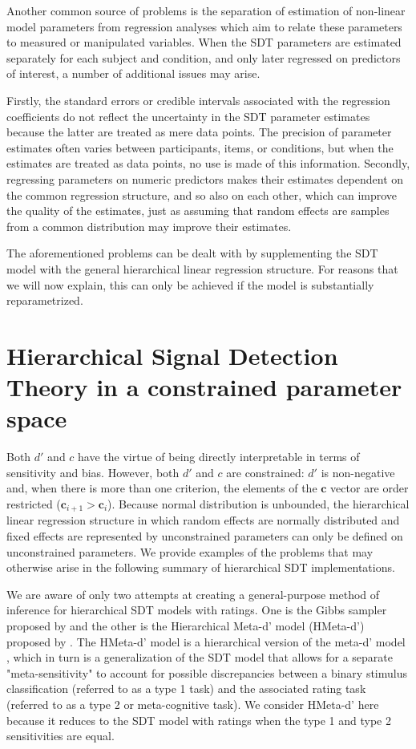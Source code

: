\documentclass[a4paper,man,apacite,floatsintext]{apa6}
\begin{document}
Another common source of problems is the separation of estimation of
non-linear model parameters from regression analyses which aim to
relate these parameters to measured or manipulated variables. When the
SDT parameters are estimated separately for each subject and
condition, and only later regressed on predictors of interest, a
number of additional issues may arise.

Firstly, the standard errors or credible intervals associated with the
regression coefficients do not reflect the uncertainty in the SDT
parameter estimates because the latter are treated as mere data
points. The precision of parameter estimates often varies between
participants, items, or conditions, but when the estimates are treated
as data points, no use is made of this information. Secondly,
regressing parameters on numeric predictors makes their estimates
dependent on the common regression structure, and so also on each
other, which can improve the quality of the estimates, just as
assuming that random effects are samples from a common distribution
may improve their estimates.

The aforementioned problems can be dealt with by supplementing the SDT
model with the general hierarchical linear regression structure. For
reasons that we will now explain, this can only be achieved if the
model is substantially reparametrized.

\section{Hierarchical Signal Detection Theory in a constrained
  parameter space}

Both $d'$ and $c$ have the virtue of being directly interpretable in
terms of sensitivity and bias. However, both $d'$ and $c$ are
constrained: $d'$ is non-negative and, when there is more than one
criterion, the elements of the $\bm{c}$ vector are order restricted
($\bm{c}_{i+1} > \bm{c}_i$). Because normal distribution is unbounded,
the hierarchical linear regression structure in which random effects
are normally distributed and fixed effects are represented by
unconstrained parameters can only be defined on unconstrained
parameters. We provide examples of the problems that may otherwise
arise in the following summary of hierarchical SDT implementations.

We are aware of only two attempts at creating a general-purpose method
of inference for hierarchical SDT models with ratings. One is the
Gibbs sampler proposed by  and the other
is the Hierarchical Meta-d' model (HMeta-d') proposed by
. The HMeta-d' model is a hierarchical version of the
meta-d' model \cite{maniscalco2012signal}, which in turn is a
generalization of the SDT model that allows for a separate
"meta-sensitivity" to account for possible discrepancies between a
binary stimulus classification (referred to as a type 1 task) and the
associated rating task (referred to as a type 2 or meta-cognitive
task). We consider HMeta-d' here because it reduces to the SDT model
with ratings when the type 1 and type 2 sensitivities are equal.
\end{document}
